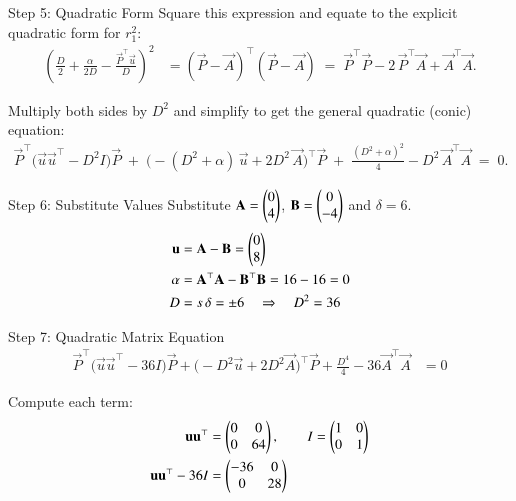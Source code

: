 \documentclass{beamer}
\begin{document}
\begin{frame}{Step 5: Quadratic Form}
Square this expression and equate to the explicit quadratic form for $r_1^2$:
\begin{align}
    \left(\frac{D}{2} + \frac{\alpha}{2D} - \frac{\vec{P}^\top\vec{u}}{D}\right)^2
    &= (\vec{P}-\vec{A})^\top(\vec{P}-\vec{A})
    \;=\; \vec{P}^\top\vec{P} - 2\,\vec{P}^\top\vec{A} + \vec{A}^\top\vec{A}.
\end{align}

Multiply both sides by $D^2$ and simplify to get the general quadratic (conic) equation:
\begin{align}
    \vec{P}^\top\big(\vec{u}\vec{u}^\top - D^2 I\big)\vec{P}
    \;+\;
    \big(-(D^2+\alpha)\,\vec{u} + 2D^2\,\vec{A}\big)^\top \vec{P}
    \;+\;
    \frac{(D^2+\alpha)^2}{4} - D^2\,\vec{A}^\top\vec{A}
    \;=\; 0.
\end{align}
\end{frame}

\begin{frame}{Step 6: Substitute Values}
Substitute $\mathbf{A}=\begin{pmatrix}0\\4\end{pmatrix}$, $\mathbf{B}=\begin{pmatrix}0\\-4\end{pmatrix}$ and $\delta=6$.
\begin{align}
    \mathbf{u} &= \mathbf{A}-\mathbf{B} = \begin{pmatrix}0\\8\end{pmatrix} \\
    \alpha &= \mathbf{A}^\top\mathbf{A} - \mathbf{B}^\top\mathbf{B} = 16 - 16 = 0 \\
    D &= s\,\delta = \pm 6 \quad\Rightarrow\quad D^2 = 36
\end{align}
\end{frame}

\begin{frame}{Step 7: Quadratic Matrix Equation}
\begin{align}
    \vec{P}^\top\big(\vec{u}\vec{u}^\top - 36I\big)\vec{P}
    + \big(-D^2\vec{u} + 2D^2\vec{A}\big)^\top \vec{P}
    + \frac{D^4}{4} - 36\vec{A}^\top\vec{A} &= 0
\end{align}

Compute each term:
\begin{align}
    \mathbf{u}\mathbf{u}^\top &= \begin{pmatrix}0 & 0 \\ 0 & 64\end{pmatrix}, \qquad
    I = \begin{pmatrix}1 & 0 \\ 0 & 1\end{pmatrix} \\
    \mathbf{u}\mathbf{u}^\top - 36I &= \begin{pmatrix}-36 & 0 \\ 0 & 28\end{pmatrix}
\end{align}
\end{frame}
\end{document}
